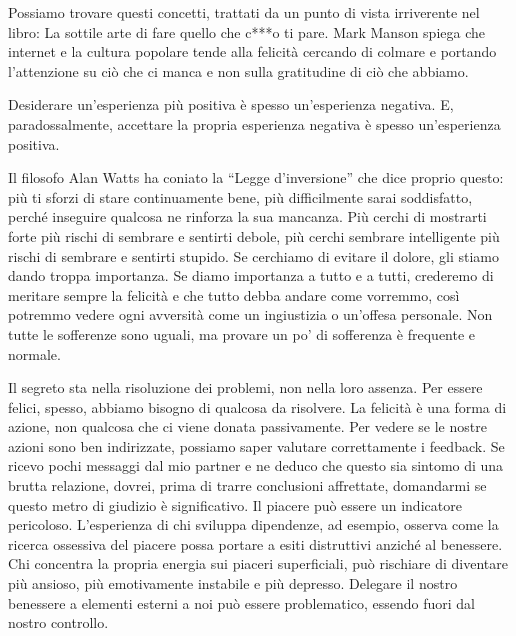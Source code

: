 \documentclass[12pt]{book} %
\begin{document}
Possiamo trovare questi concetti, trattati da un punto di vista irriverente nel libro: La sottile arte di fare quello
che c***o ti pare. Mark Manson spiega che internet e la cultura popolare
tende alla felicità cercando di colmare e portando l'attenzione su ciò che ci manca e non sulla gratitudine di ciò che abbiamo.

Desiderare un'esperienza più positiva è spesso un'esperienza negativa. 
E, paradossalmente, accettare la propria esperienza negativa è spesso un'esperienza positiva.

Il filosofo Alan Watts ha coniato la “Legge d'inversione” che dice proprio questo: 
più ti sforzi di stare continuamente bene, più difficilmente sarai soddisfatto, perché inseguire qualcosa ne rinforza la sua mancanza. Più cerchi di mostrarti forte più rischi di sembrare e sentirti debole, più cerchi sembrare intelligente più rischi di sembrare e sentirti stupido. Se cerchiamo di evitare il dolore, gli stiamo dando troppa importanza. Se diamo importanza a tutto e a tutti, crederemo di
meritare sempre la felicità e che tutto debba andare come vorremmo, così potremmo vedere ogni avversità come un ingiustizia o
un'offesa personale. Non tutte le sofferenze sono uguali, ma provare un po' di sofferenza è frequente e normale.

Il segreto sta nella risoluzione dei problemi, non nella loro assenza. Per essere felici, spesso, abbiamo bisogno di qualcosa da
risolvere. La felicità è una forma di azione, non qualcosa che ci viene donata passivamente. 
Per vedere se le nostre azioni sono ben indirizzate, possiamo saper valutare correttamente i feedback. Se
ricevo pochi messaggi dal mio partner e ne deduco che questo sia sintomo di una brutta relazione, dovrei, prima di
trarre conclusioni affrettate, domandarmi se questo metro di giudizio è significativo. Il piacere può essere un
indicatore pericoloso. L'esperienza di chi sviluppa dipendenze, ad esempio, osserva come la ricerca ossessiva del piacere possa portare a esiti distruttivi anziché al benessere. Chi concentra la propria energia sui piaceri superficiali, può rischiare di diventare più ansioso, più emotivamente instabile e più depresso. Delegare il nostro benessere a elementi esterni a noi può essere problematico, essendo fuori dal nostro controllo. 
\end{document}
